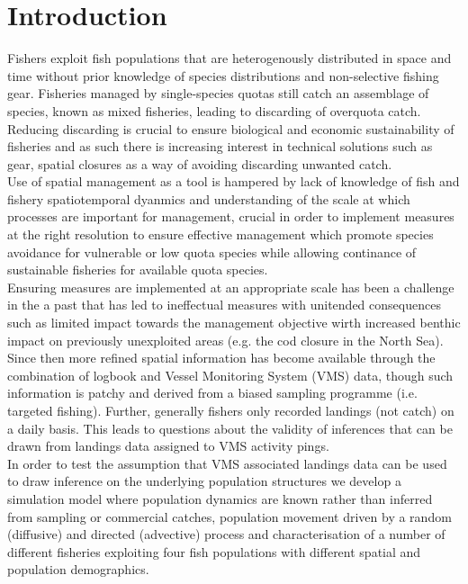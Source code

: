 \documentclass[review]{elsarticle}
\begin{document}
\section{Introduction}

Fishers exploit fish populations that are heterogenously distributed in space
and time without prior knowledge of species distributions and non-selective
fishing gear. Fisheries managed by single-species quotas still catch an
assemblage of species, known as mixed fisheries, leading to discarding of
overquota catch. Reducing discarding is crucial to ensure biological and
economic sustainability of fisheries and as such there is increasing interest
in technical solutions such as gear, spatial closures as a way of avoiding
discarding unwanted catch. \\

Use of spatial management as a tool is hampered by lack of knowledge of fish
and fishery spatiotemporal dyanmics and understanding of the scale at which
processes are important for management, crucial in order to implement measures
at the right resolution to ensure effective management\cite{Dunn2016} which
promote species avoidance for vulnerable or low quota species while allowing
continance of sustainable fisheries for available quota species. \\

Ensuring measures are implemented at an appropriate scale has been a challenge
in the a past that has led to ineffectual measures with unitended consequences
such as limited impact towards the management objective wirth increased benthic
impact on previously unexploited areas (e.g. the cod closure in the North
Sea\cite{Rijnsdorp2001,Dinmore2003}). Since then more refined spatial
information has become available through the combination of logbook and Vessel
Monitoring System (VMS) data\cite{Lee2010, Bastardie2010, Gerritsen2012,
	Mateo2016}, though such information is patchy and derived from a biased
sampling programme (i.e.  targeted fishing). Further, generally fishers only
recorded landings (not catch) on a daily basis. This leads to questions about the
validity of inferences that can be drawn from landings data assigned to VMS
activity pings. \\ 

In order to test the assumption that VMS associated landings data can be used
to draw inference on the underlying population structures we develop a
simulation model where population dynamics are known rather than inferred from
sampling or commercial catches, population movement driven by a random
(diffusive) and directed (advective) process and characterisation of a number
of different fisheries exploiting four fish populations with different spatial
and population demographics.\\
\end{document}
